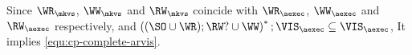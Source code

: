 \begin{itemize}
Since \( \WR_\mkvs \), \( \WW_\mkvs \) and \( \RW_\mkvs \) coincide with
\( \WR_\aexec \), \( \WW_\aexec \) and \( \RW_\aexec \) respectively,
and \( \left( (\SO \cup \WR ) ; \RW? \cup \WW \right)^* ; \VIS_\aexec \subseteq \VIS_\aexec \),
It implies \cref{equ:cp-complete-arvis}.
\end{itemize}
